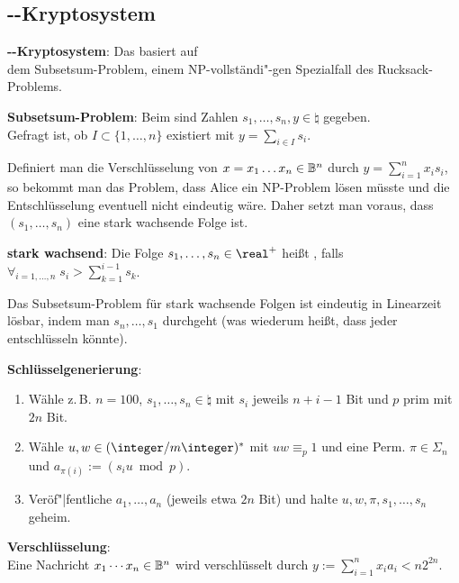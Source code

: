 \pagebreak

\subsection{%
    --Kryptosystem%
}

\textbf{--Kryptosystem}:
Das  basiert auf\\
dem Subsetsum-Problem, einem
NP-vollständi"-gen Spezialfall des Rucksack-Problems.

\textbf{Subsetsum-Problem}:
Beim  sind Zahlen $s_1, \dotsc, s_n, y \in \natural$ gegeben.\\
Gefragt ist, ob $I \subset \{1, \dotsc, n\}$ existiert mit $y = \sum_{i \in I} s_i$.

Definiert man die Verschlüsselung von $x = x_1 \dotsc x_n \in \mathbb{B}^n$ durch
$y = \sum_{i=1}^n x_i s_i$, so bekommt man das Problem, dass Alice ein NP-Problem lösen müsste
und die Entschlüsselung eventuell nicht eindeutig wäre.
Daher setzt man voraus, dass $(s_1, \dotsc, s_n)$ eine stark wachsende Folge ist.

\textbf{stark wachsend}:
Die Folge $s_1, \dotsc, s_n \in \real^+$ heißt , falls
$\forall_{i=1,\dotsc,n}\; s_i > \sum_{k=1}^{i-1} s_k$.

Das Subsetsum-Problem für stark wachsende Folgen ist eindeutig in Linearzeit lösbar,
indem man $s_n, \dotsc, s_1$ durchgeht (was wiederum heißt, dass jeder entschlüsseln könnte).

\linie

\textbf{Schlüsselgenerierung}:
\begin{enumerate}
    \item
    Wähle z.\,B. $n = 100$, $s_1, \dotsc, s_n \in \natural$ mit $s_i$ jeweils $n + i - 1$ Bit und
    $p$ prim mit $2n$ Bit.
    
    \item
    Wähle $u, w \in (\ZmZ)^\ast$ mit $uw \equiv_p 1$ und eine Perm. $\pi \in \Sigma_n$
    und $a_{\pi(i)} := (s_i u \bmod p)$.
    
    \item
    Veröf"|fentliche $a_1, \dotsc, a_n$ (jeweils etwa $2n$ Bit)
    und halte $u, w, \pi, s_1, \dotsc, s_n$ geheim.
\end{enumerate}

\textbf{Verschlüsselung}:\\
Eine Nachricht $x_1 \dotsb x_n \in \mathbb{B}^n$ wird verschlüsselt durch
$y := \sum_{i=1}^n x_i a_i < n 2^{2n}$.

